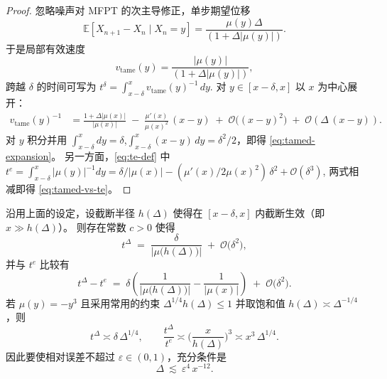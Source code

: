 \begin{proof}
	忽略噪声对 MFPT 的次主导修正，单步期望位移
	\[
	\mathbb E[X_{n+1}-X_n\mid X_n=y]
	=
	\frac{\mu(y)\Delta}{(1+\Delta\lvert\mu(y)\rvert)}.
	\]
	于是局部有效速度
	\[
	v_{\mathrm{tame}}(y)=\frac{\lvert\mu(y)\rvert}{(1+\Delta\lvert\mu(y)\rvert)},
	\]
	跨越 \(\delta\) 的时间可写为
	\(
	t^{\delta}=\int_{x-\delta}^{x} v_{\mathrm{tame}}(y)^{-1}\,dy
	\).
	对 \(y\in[x-\delta,x]\) 以 \(x\) 为中心展开：
	\begin{align}
	v_{\mathrm{tame}}(y)^{-1} 
	&=
	\frac{1+\Delta\lvert\mu(x)\rvert}{\lvert\mu(x)\rvert}
	\;-\;\frac{\mu'(x)}{\mu(x)^{2}}\,(x-y)
	\;+\;\mathcal O\!\big((x-y)^{2}\big)
	\;+\;\mathcal O(\Delta\,(x-y)).
	\end{align}
	对 \(y\) 积分并用
	\(\int_{x-\delta}^{x}dy=\delta\),\(\int_{x-\delta}^{x}(x-y)\,dy=\delta^{2}/2\)，即得
	\eqref{eq:tamed-expansion}。
	另一方面，\eqref{eq:te-def} 中
	\(
	t^{e}=\int_{x-\delta}^{x}\lvert\mu(y)\rvert^{-1}dy
	=
	\delta/\lvert\mu(x)\rvert-(\mu'(x)/2\mu(x)^{2})\,\delta^{2}+\mathcal O(\delta^{3})
	\),
	两式相减即得 \eqref{eq:tamed-vs-te}。
\end{proof}

\begin{theorem}\label{thm:trunc-mfpt}
	沿用上面的设定，设截断半径 \(h(\Delta)\) 使得在 \([x-\delta,x]\) 内截断生效（即 \(x\gg h(\Delta)\)）。
	则存在常数 \(c>0\) 使得
	\begin{equation}\label{eq:trunc-expansion}
		t^{\Delta}
		\;=\;
		\frac{\delta}{\lvert \mu\!\big(h(\Delta)\big)\rvert}
		\;+\;\mathcal O\!\Big(\delta^{2}\Big),
	\end{equation}
	并与 \(t^{e}\) 比较有
	\begin{equation}\label{eq:trunc-vs-te}
		t^{\Delta}-t^{e}
		\;=\;
		\delta\!\left(
		\frac{1}{\lvert \mu\!\big(h(\Delta)\big)\rvert}
		-\frac{1}{\lvert \mu(x)\rvert}
		\right)
		\;+\;\mathcal O\!\Big(\delta^{2}\Big).
	\end{equation}
	若 \(\mu(y)=-y^{3}\) 且采用常用的约束 \(\Delta^{1/4}h(\Delta)\le1\) 并取饱和值
	\(h(\Delta)\asymp \Delta^{-1/4}\)，则
	\[
	t^{\Delta}\asymp \delta\,\Delta^{1/4},
	\qquad
	\frac{t^{\Delta}}{t^{e}}
	\asymp
	\Big(\frac{x}{h(\Delta)}\Big)^{3}
	\asymp x^{3}\,\Delta^{1/4}.
	\]
	因此要使相对误差不超过 \(\varepsilon\in(0,1)\)，充分条件是
	\begin{equation}\label{eq:trunc-stepsize}
		\Delta\ \lesssim\ \varepsilon^{4}\,x^{-12}.
	\end{equation}
\end{theorem}

